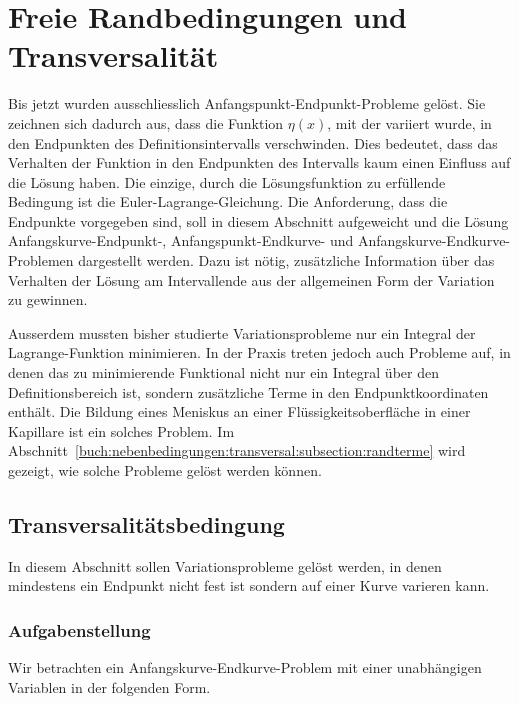 %
%
%
\section{Freie Randbedingungen und Transversalität
\label{buch:nebenbedingungen:section:transversl}}
Bis jetzt wurden ausschliesslich Anfangspunkt-Endpunkt-Probleme gelöst.
Sie zeichnen sich dadurch aus, dass die Funktion $\eta(x)$, mit der
variiert wurde, in den Endpunkten des Definitionsintervalls
verschwinden.
Dies bedeutet, dass das Verhalten der Funktion in den Endpunkten des
Intervalls kaum einen Einfluss auf die Lösung haben.
Die einzige, durch die Lösungsfunktion zu erfüllende Bedingung ist die
Euler-Lagrange-Gleichung.
Die Anforderung, dass die Endpunkte vorgegeben sind, soll in diesem
Abschnitt aufgeweicht und die Lösung Anfangskurve-Endpunkt-,
Anfangspunkt-Endkurve- und Anfangskurve-Endkurve-Problemen dargestellt
werden.
Dazu ist nötig, zusätzliche Information über das Verhalten der Lösung
am Intervallende aus der allgemeinen Form der Variation zu gewinnen.

Ausserdem mussten bisher studierte Variationsprobleme nur ein 
Integral der Lagrange-Funktion minimieren.
In der Praxis treten jedoch auch Probleme auf, in denen das zu
minimierende Funktional nicht nur ein Integral über den Definitionsbereich
ist, sondern zusätzliche Terme in den Endpunktkoordinaten enthält.
Die Bildung eines Meniskus an einer Flüssigkeitsoberfläche in einer 
Kapillare ist ein solches Problem.
Im Abschnitt~\ref{buch:nebenbedingungen:transversal:subsection:randterme}
wird gezeigt, wie solche Probleme gelöst werden können.

%
%
\subsection{Transversalitätsbedingung
\label{buch:nebenbedingungen:transversal:subsection:transversalitaetsbedingung}}
In diesem Abschnitt sollen Variationsprobleme gelöst werden, in denen
mindestens ein Endpunkt nicht fest ist sondern auf einer Kurve
varieren kann.

%
%
\subsubsection{Aufgabenstellung}
Wir betrachten ein Anfangskurve-Endkurve-Problem mit einer unabhängigen
Variablen in der folgenden Form.

